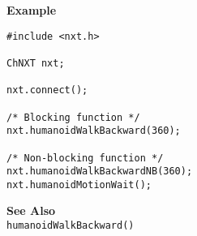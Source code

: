 \noindent
{\bf Example}
\begin{verbatim}
#include <nxt.h>

ChNXT nxt;

nxt.connect();

/* Blocking function */
nxt.humanoidWalkBackward(360);

/* Non-blocking function */
nxt.humanoidWalkBackwardNB(360);
nxt.humanoidMotionWait();
\end{verbatim}

\noindent
{\bf See Also}\\
\texttt{humanoidWalkBackward()}

